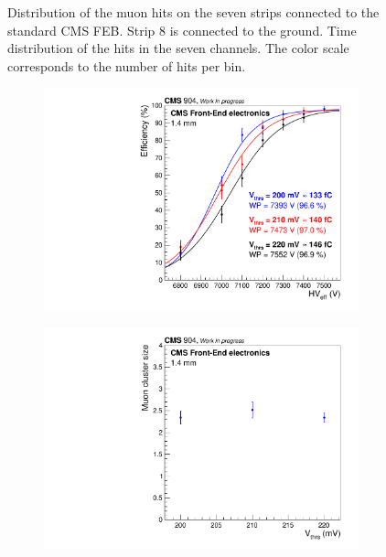 \begin{figure}[H]
\begin{subfigure}{0.5\linewidth}
			\caption{\label{fig:iRPC_CMS_Profiles:B}}
		\end{subfigure}
		\caption{\label{fig:iRPC_CMS_Profiles}  Distribution of the muon hits on the seven strips connected to the standard CMS FEB. Strip 8 is connected to the ground.  Time distribution of the hits in the seven channels. The color scale corresponds to the number of hits per bin.}
    \end{figure}
	 
	\begin{figure}[H]
		\begin{subfigure}{.5\linewidth}
		    \centering
			\includegraphics[width = \linewidth]{fig/chapt6/iRPC-CMS_FEB-muonEfficiency.pdf}
			\caption{\label{fig:iRPC_CMS_Result:A}}
		\end{subfigure}
		\begin{subfigure}{.5\linewidth}
		    \centering
			\includegraphics[width = \linewidth]{fig/chapt6/iRPC-CMS_FEB-thrs_CLS.pdf}

\end{subfigure}
\end{figure}
